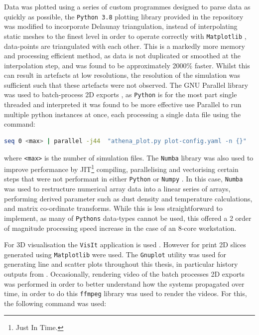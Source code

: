 Data was plotted using a series of custom programmes designed to parse data as quickly as possible, 
the \texttt{Python 3.8} \parencite{10.5555/1593511} plotting library provided in the \athena{} repository was modified to incorporate Delaunay triangulation, instead of interpolating static meshes to the finest level in order to operate correctly with \texttt{Matplotlib} \parencite{Hunter:2007}, data-points are triangulated with each other.
This is a markedly more memory and processing efficient method, as data is not duplicated or smoothed at the interpolation step, and was found to be approximately 2000\% faster.
Whilst this can result in artefacts at low resolutions, the resolution of the simulation was sufficient such that these artefacts were not observed.
The GNU Parallel library was used to batch-process 2D exports \parencite{tange_2021_5523272}, as \texttt{Python} is for the most part single threaded and interpreted it was found to be more effective use Parallel to run multiple python instances at once, each processing a single data file using the command:

\begin{lstlisting}[language=bash]
seq 0 <max> | parallel -j44  "athena_plot.py plot-config.yaml -n {}"
\end{lstlisting}

\noindent
where \texttt{<max>} is the number of simulation files.
The \texttt{Numba} library \parencite{lam2015numba} was also used to improve performance by  JIT\footnote{Just In Time.} compiling, parallelising and vectorising certain steps that were not performant in either \texttt{Python} or \texttt{Numpy} \parencite{harris2020array}.
In this case, \texttt{Numba} was used to restructure numerical array data into a linear series of arrays, performing derived parameter such as dust density and temperature calculations, and matrix co-ordinate transforms.
While this is less straightforward to implement, as many of \texttt{Pythons} data-types cannot be used, this offered a 2 order of magnitude processing speed increase in the case of an 8-core workstation.

For 3D visualisation the \texttt{VisIt} application is used \parencite{HPV:VisIt}.
However for print 2D slices generated using \texttt{Matplotlib} were used. 
The \texttt{Gnuplot} utility \parencite{gnuplot} was used for generating line and scatter plots throughout this thesis, in particular history outputs from \athena{}.
Occasionally, rendering video of the batch processes 2D exports was performed in order to better understand how the systems propagated over time, in order to do this \texttt{ffmpeg} library \parencite{tomar2006converting} was used to render the videos.
For this, the following command was used:

